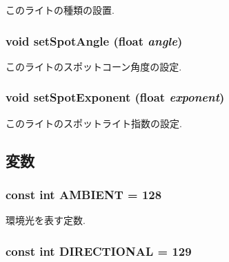 このライトの種類の設置. \hypertarget{classm3g_1_1Light_30ce206b37f6ed5e918fbc75b3f91072}{
\subsubsection[{setSpotAngle}]{\setlength{\rightskip}{0pt plus 5cm}void setSpotAngle (float {\em angle})}}
\label{classm3g_1_1Light_30ce206b37f6ed5e918fbc75b3f91072}


このライトのスポットコーン角度の設定. \hypertarget{classm3g_1_1Light_787eb66801e17d0412559598326ce19d}{
\subsubsection[{setSpotExponent}]{\setlength{\rightskip}{0pt plus 5cm}void setSpotExponent (float {\em exponent})}}
\label{classm3g_1_1Light_787eb66801e17d0412559598326ce19d}


このライトのスポットライト指数の設定. 

\subsection{変数}
\hypertarget{classm3g_1_1Light_4cf648a82d9de62a1fb15f4277049594}{
\subsubsection[{AMBIENT}]{\setlength{\rightskip}{0pt plus 5cm}const int {\bf AMBIENT} = 128}}
\label{classm3g_1_1Light_4cf648a82d9de62a1fb15f4277049594}


環境光を表す定数. \hypertarget{classm3g_1_1Light_a2fb668ca8bbeb8323eda98fba594fda}{
\subsubsection[{DIRECTIONAL}]{\setlength{\rightskip}{0pt plus 5cm}const int {\bf DIRECTIONAL} = 129}}
\label{classm3g_1_1Light_a2fb668ca8bbeb8323eda98fba594fda}


